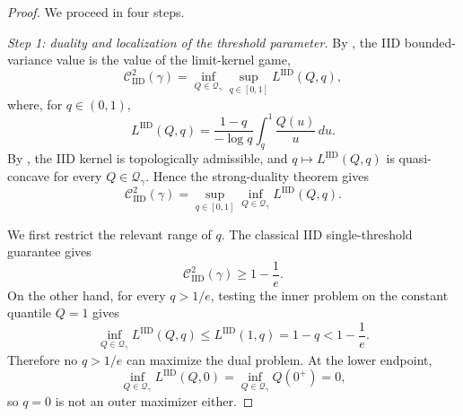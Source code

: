 \documentclass[10pt,a4paper]{amsart}
\newcommand{\CIID}{\mathcal{C}^{2}_{\mathrm{IID}}(\comp)}
\newcommand{\LIID}{L^{\mathrm{IID}}}
\newcommand{\Qgam}{\mathcal{Q}_{\comp}}
\newcommand{\comp}{\gamma}
\begin{document}
\begin{proof}
We proceed in four steps.

\medskip

\noindent\emph{Step 1: duality and localization of the threshold parameter.}
By , the IID bounded-variance value is
the value of the limit-kernel game,
\begin{equation}\label{eq:iid_primal_variational}
    \CIID
    =
    \inf_{Q\in\Qgam}
    \sup_{q\in[0,1]}
    \LIID(Q,q),
\end{equation}
where, for $q\in(0,1)$,
\begin{equation*}
    \LIID(Q,q)
    =
    \frac{1-q}{-\log q}
    \int_q^1\frac{Q(u)}{u}\,du.
\end{equation*}
By , the IID kernel is topologically
admissible, and $q\mapsto\LIID(Q,q)$ is quasi-concave for every
$Q\in\Qgam$. Hence the strong-duality theorem gives
\begin{equation}\label{eq:iid_dual_variational}
    \CIID
    =
    \sup_{q\in[0,1]}
    \inf_{Q\in\Qgam}
    \LIID(Q,q).
\end{equation}

We first restrict the relevant range of $q$. The classical IID
single-threshold guarantee gives
\begin{equation*}
    \CIID\geq 1-\frac1e.
\end{equation*}
On the other hand, for every $q>1/e$, testing the inner problem on
the constant quantile $Q=1$ gives
\begin{equation*}
    \inf_{Q\in\Qgam}\LIID(Q,q)
    \leq
    \LIID(1,q)
    =
    1-q
    <
    1-\frac1e.
\end{equation*}
Therefore no $q>1/e$ can maximize the dual problem. At the lower
endpoint,
\begin{equation*}
    \inf_{Q\in\Qgam}\LIID(Q,0)
    =
    \inf_{Q\in\Qgam}Q(0^+)
    =
    0,
\end{equation*}
so $q=0$ is not an outer maximizer either.


\end{proof}
\end{document}
